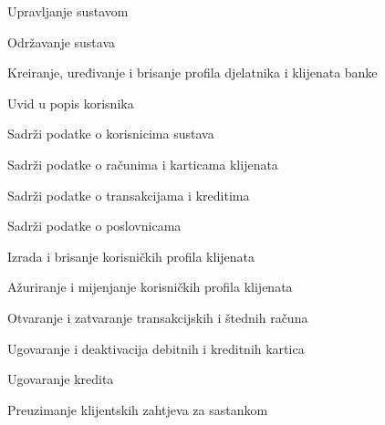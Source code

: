 			
			\begin{packed_enum}
				\item  {}
				
				\begin{packed_enum}
					
					\item Upravljanje sustavom
					\item Održavanje sustava
					\item Kreiranje, uređivanje i brisanje profila djelatnika i klijenata banke
					\item Uvid u popis korisnika
					
				\end{packed_enum}
			
				\item  {}
				
				\begin{packed_enum}
					
					\item Sadrži podatke o korisnicima sustava
					\item Sadrži podatke o računima i karticama klijenata
					\item Sadrži podatke o transakcijama i kreditima
					\item Sadrži podatke o poslovnicama
					
				\end{packed_enum}
				
				\item	{}
				
				\begin{packed_enum}
					
					\item Izrada i brisanje korisničkih profila klijenata
					\item Ažuriranje i mijenjanje korisničkih profila klijenata
					\item Otvaranje i zatvaranje transakcijskih i štednih računa
					\item Ugovaranje i deaktivacija debitnih i kreditnih kartica
					\item Ugovaranje kredita
					\item Preuzimanje klijentskih zahtjeva za sastankom
					
				\end{packed_enum}
			
				\item	{}
				

\end{packed_enum}
